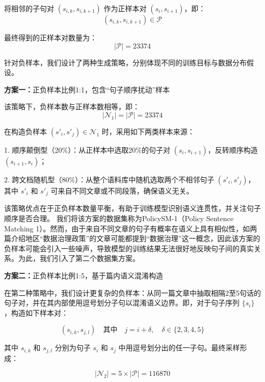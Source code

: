 \documentclass[12pt, a4paper]{ctexart}
\begin{document}
将相邻的子句对 $(s_{i,k}, s_{i,k+1})$ 作为正样本对 $(s_i, s_{i+1})$，即：
\begin{equation}
(s_{i,k}, s_{i,k+1}) \in \mathcal{P}
\end{equation}

最终得到的正样本对数量为：
\begin{equation}
|\mathcal{P}| = 23374
\end{equation}

针对负样本，我们设计了两种生成策略，分别体现不同的训练目标与数据分布假设。

\textbf{方案一：}正负样本比例1:1，包含“句子顺序扰动”样本

该策略下，负样本数与正样本数相等，即：
\begin{equation}
|\mathcal{N}_1| = |\mathcal{P}| = 23374
\end{equation}

在构造负样本 $(s'_i, s'_j) \in \mathcal{N}_1$ 时，采用如下两类样本来源：

1. 顺序颠倒型（20\%）：从正样本中选取20\%的句子对 $(s_i, s_{i+1})$，反转顺序构造 $(s_{i+1}, s_i)$；

2. 跨文档随机型（80\%）：从整个语料库中随机选取两个不相邻句子 $(s'_i, s'_j)$，其中 $s'_i$ 和 $s'_j$ 可来自不同文章或不同段落，确保语义无关。

该策略优点在于正负样本数量平衡，有助于训练模型识别语义连贯性，并关注句子顺序是否合理。
我们将该方案的数据集称为PolicySM-1（Policy Sentence Matching 1）。然而，由于来自不同文章的句子有概率在语义上具有相似性，如两篇介绍地区“数据治理政策”的文章可能都提到“数据治理”这一概念，因此该方案的负样本可能会引入一些噪声，导致模型的训练结果无法很好地反映句子间的真实关系。为此，我们引入了第二个数据集方案。

\vspace{2em} %

\textbf{方案二：}正负样本比例1:5，基于篇内语义混淆构造

在第二种策略中，我们设计更复杂的负样本：从同一篇文章中抽取相隔2至5句话的句子对，并在其内部使用逗号划分子句以混淆语义边界。即，对于句子序列 $\{s_i\}$，构造如下样本对：

\begin{equation}
(s_{i,k}, s_{j,l}) \quad \text{其中} \quad j = i + \delta,\quad \delta \in \{2, 3, 4, 5\}
\end{equation}

其中 $s_{i,k}$ 和 $s_{j,l}$ 分别为句子 $s_i$ 和 $s_j$ 中用逗号划分出的任一子句。最终采样形成：

\begin{equation}
|\mathcal{N}_2| = 5 \times |\mathcal{P}| = 116870
\end{equation}
\end{document}
